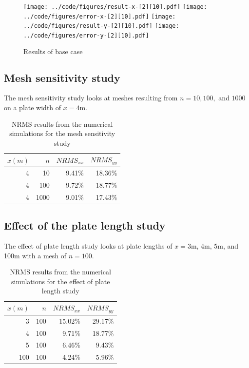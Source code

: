 \documentclass[twocolumn,10pt]{asme2ej}
\begin{document}
\begin{figure}[b]
\begin{center}
\texttt{[image: ../code/figures/result-x-[2][10].pdf]}
\texttt{[image: ../code/figures/error-x-[2][10].pdf]}
\texttt{[image: ../code/figures/result-y-[2][10].pdf]}
\texttt{[image: ../code/figures/error-y-[2][10].pdf]}
\caption{Results of base case}
\label{base_study}
\end{center}
\end{figure}

\subsection{Mesh sensitivity study}
The mesh sensitivity study looks at meshes resulting from $n = 10, 100, $ and $1000$ on a plate width of $x = 4$m.

\begin{table}[htb]
\begin{center}
\label{mesh_table}
\begin{tabular}{|r r | r r|}
\hline
$x (m)$ & $n$ & $NRMS_{xx}$ & $NRMS_{yy}$ \\
\hline
4 & 10   & 9.41\% & 18.36\% \\
4 & 100  & 9.72\% & 18.77\% \\
4 & 1000 & 9.01\% & 17.43\% \\
\hline
\end{tabular}
\caption{NRMS results from the numerical simulations for the mesh sensitivity study}
\end{center}
\end{table}

\subsection{Effect of the plate length study}
The effect of plate length study looks at plate lengths of $x = 3$m, 4m, 5m, and 100m with a mesh of $n = 100$.

\begin{table}[htb]
\begin{center}
\label{mesh_table}
\begin{tabular}{|r r | r r|}
\hline
$x (m)$ & $n$ & $NRMS_{xx}$ & $NRMS_{yy}$ \\
\hline
3   & 100 & 15.02\% & 29.17\% \\
4   & 100 &  9.71\% & 18.77\% \\
5   & 100 &  6.46\% &  9.43\% \\
100 & 100 &  4.24\% &  5.96\% \\
\hline
\end{tabular}
\caption{NRMS results from the numerical simulations for the effect of plate length study}
\end{center}
\end{table}
\end{document}

